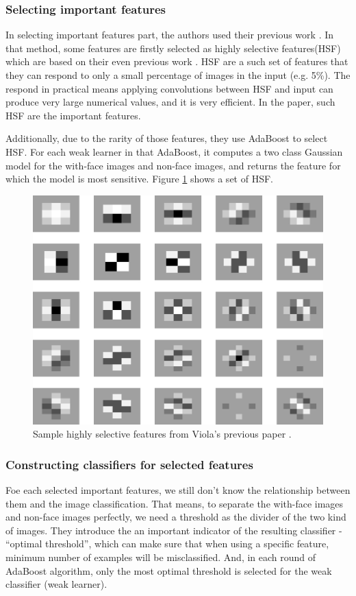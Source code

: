 \documentclass[10pt,twocolumn,letterpaper]{article}
\begin{document}
\subsubsection{Selecting important features}
In selecting important features part, the authors used their previous work \cite{imgret}.
In that method, some features are firstly selected as highly selective features(HSF) which are based on their even previous work \cite{imgdb}.
HSF are a such set of features that they can respond to only a small percentage of images in the input (e.g. 5\%).
The respond in practical means applying convolutions between HSF and input can produce very large numerical values, and it is very efficient.
In the paper, such HSF are the important features.

Additionally, due to the rarity of those features, they use AdaBoost to select HSF.
For each weak learner in that AdaBoost, it computes a two class Gaussian model for the with-face images and non-face images,
and returns the feature for which the model is most sensitive. Figure \ref{fig:hsf} shows a set of HSF.

\begin{figure}[t]
    \begin{center}
        \includegraphics[width=0.9\linewidth]{highly-selective-features}
    \end{center}
    \caption{Sample highly selective features from Viola's previous paper \cite{imgret}.}
    \label{fig:hsf}
\end{figure}

\subsubsection{Constructing classifiers for selected features}
Foe each selected important features, we still don't know the relationship between them and the image classification.
That means, to separate the with-face images and non-face images perfectly, we need a threshold as the divider of the two kind of images.
They introduce the an important indicator of the resulting classifier - ``optimal threshold'', which can make sure that
when using a specific feature, minimum number of examples will be misclassified.
And, in each round of AdaBoost algorithm, only the most optimal threshold is selected for the weak classifier (weak learner).
\end{document}

